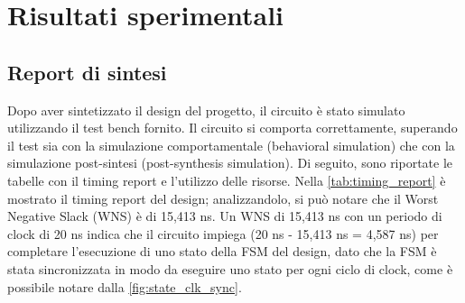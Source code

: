 \documentclass[11pt,a4paper]{article}
\begin{document}
\newpage

\section{Risultati sperimentali}

\vspace{0.2em}\subsection{Report di sintesi}

\vspace{0.3em}\hspace{1em} Dopo aver sintetizzato il design del progetto, il circuito è stato simulato utilizzando il test bench fornito. Il circuito si comporta correttamente, superando il test sia con la simulazione comportamentale (behavioral simulation) che con la simulazione post-sintesi (post-synthesis simulation). Di seguito, sono riportate le tabelle con il timing report e l'utilizzo delle risorse. Nella \autoref{tab:timing_report} è mostrato il timing report del design; analizzandolo, si può notare che il Worst Negative Slack (WNS) è di 15,413 ns. Un WNS di 15,413 ns con un periodo di clock di 20 ns indica che il circuito impiega (20 ns - 15,413 ns = 4,587 ns) per completare l'esecuzione di uno stato della FSM del design, dato che la FSM è stata sincronizzata in modo da eseguire uno stato per ogni ciclo di clock, come è possibile notare dalla \autoref{fig:state_clk_sync}.

\vspace{1em}
\end{document}
